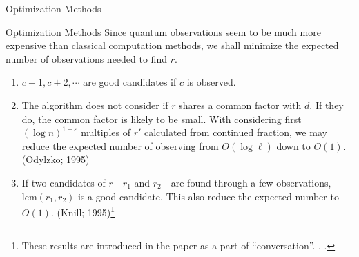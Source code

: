 \documentclass{beamer}
\newcommand{\mrm}[1]{\mathrm{#1}}
\renewcommand{\:}{\text{ }}
\begin{document}
    \begin{frame}{Optimization Methods}
        \begin{block}{Optimization Methods}
            \small
            Since quantum observations seem to be much more expensive than classical computation methods,
            we shall minimize the expected number of observations needed to find $r$.
            \begin{enumerate}
                \item $c \pm 1, c \pm 2, \cdots$ are good candidates if $c$ is observed.
                \item The algorithm does not consider if $r$ shares a common factor with $d$. If they do, the common factor is likely to be small.
                      With considering first $(\log n)^{1+\varepsilon}$ multiples of $r'$ calculated from continued fraction, we may reduce the expected number of observing from $O(\log \ell)$ down to $O(1)$. (Odylzko; 1995)
                \item If two candidates of $r$---$r_1$ and $r_2$---are found through a few observations, $\mrm{lcm}(r_1, r_2)$ is a good candidate. This also reduce the expected number to $O(1)$. (Knill; 1995)\footnote{These results are introduced in the paper as a part of ``conversation''. . .}
            \end{enumerate}
        \end{block}
    \end{frame}
\end{document}
